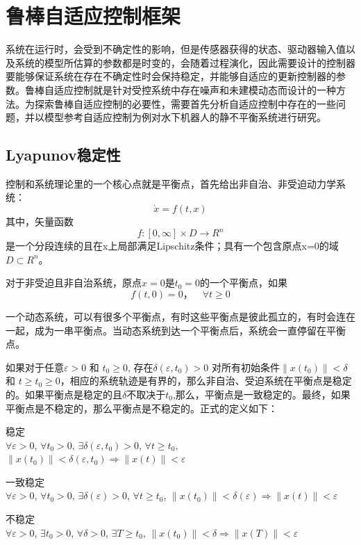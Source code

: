 \section{鲁棒自适应控制框架 }

系统在运行时，会受到不确定性的影响，但是传感器获得的状态、驱动器输入值以及系统的模型所估算的参数都是时变的，会随着过程演化，因此需要设计的控制器要能够保证系统在存在不确定性时会保持稳定，并能够自适应的更新控制器的参数。鲁棒自适应控制就是针对受控系统中存在噪声和未建模动态而设计的一种方法。为探索鲁棒自适应控制的必要性，需要首先分析自适应控制中存在的一些问题，并以模型参考自适应控制为例对水下机器人的静不平衡系统进行研究。


\subsection{Lyapunov稳定性 }

控制和系统理论里的一个核心点就是平衡点，首先给出非自治、非受迫动力学系统：
\begin{equation}
\dot x = f(t,x)
\end{equation}
其中，矢量函数\[ f:[0, \infty] \times D \rightarrow R^n\] 是一个分段连续的且在x上局部满足Lipschitz条件；具有一个包含原点x=0的域$D\subset R^n$。

\begin{defn}
对于非受迫且非自治系统，原点$x=0$是$t_0 =0$的一个平衡点，如果
\begin{equation}
f(t,0)=0 ，\quad \forall t \geqslant 0
\end{equation}
\end{defn}

一个动态系统，可以有很多个平衡点，有时这些平衡点是彼此孤立的，有时会连在一起，成为一串平衡点。当动态系统到达一个平衡点后，系统会一直停留在平衡点。

\begin{defn}[李亚普诺夫平衡稳定性]
如果对于任意$\varepsilon >0$ 和 $t_0 \geqslant 0$, 存在$\delta(\varepsilon ,t_0)>0$ 对所有初始条件$\left \| x(t_0) \right \| < \delta$ 和 $t \geq t_0 \geq 0$，相应的系统轨迹是有界的，那么非自治、受迫系统在平衡点是稳定的。如果平衡点是稳定的且$\delta$不取决于$t_0$,那么，平衡点是一致稳定的。最终，如果平衡点是不稳定的，那么平衡点是不稳定的。正式的定义如下：

稳定\\
$\forall \varepsilon >0$, $\forall t_0 >0$, $\exists \delta(\varepsilon,t_0)>0$, $\forall t \geqslant t_0$, $\left \| x(t_0) \right \| < \delta(\varepsilon,t_0) \Rightarrow \left \|  x(t) \right \| <\varepsilon$

一致稳定\\
$\forall \varepsilon >0$, $\forall t_0 >0$, $\exists \delta(\varepsilon)>0$, $\forall t \geqslant t_0$, $\left \| x(t_0) \right \| < \delta(\varepsilon) \Rightarrow \left \|  x(t) \right \| <\varepsilon$

不稳定\\
$\forall \varepsilon >0$, $\exists t_0 >0 $, $\forall \delta>0$, $\exists T\geqslant t_0$, $\left \| x(t_0) \right \| < \delta \Rightarrow \left \|  x(T) \right \| <\varepsilon$
\end{defn}

